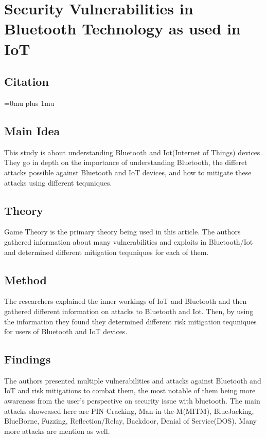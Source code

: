 \documentclass[letterpaper,12pt]{article}
\begin{document}
\noindent
\section{Security Vulnerabilities in Bluetooth Technology as used in IoT}

\noindent
\subsection{Citation}

\Urlmuskip=0mu plus 1mu\relax
{}

\subsection{Main Idea}

\noindent
This study is about understanding Bluetooth and Iot(Internet of Things) devices. They go in depth on the importance of understanding Bluetooth, the differet attacks possible against Bluetooth and IoT devices, and how to mitigate these attacks using different tequniques.  

\subsection{Theory}

\noindent
Game Theory is the primary theory being used in this article.  The authors gathered information about many vulnerabilities and exploits in Bluetooth/Iot and determined different mitigation tequniques for each of them. 

\subsection{Method}

\noindent
The researchers explained the inner workings of IoT and Bluetooth and then gathered different information on attacks to Bluetooth and Iot. Then, by using the information they found they determined different risk mitigation tequniques for users of Bluetooth and IoT devices.

\subsection{Findings}

\noindent
The authors presented multiple vulnerabilities and attacks against Bluetooth and IoT and risk mitigations to combat them, the most notable of them being more awareness from the user's perspective on security issue with bluetooth. The main attacks showcased here are PIN Cracking, Man-in-the-M(MITM), BlueJacking, BlueBorne, Fuzzing, Reflection/Relay, Backdoor, Denial of Service(DOS). Many more attacks are mention as well.
\end{document}
